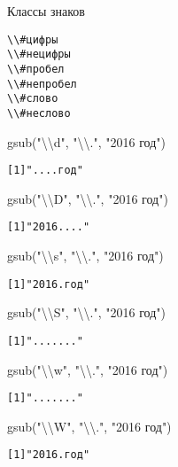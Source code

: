 \begin{frame}[fragile]{Классы знаков}
\footnotesize
\begin{alltt}
\textbackslash\textbackslash{\color{red!13!blue}{d}} \hfill \# цифры
\textbackslash\textbackslash{\color{red!13!blue}{D}} \hfill \# не цифры
\textbackslash\textbackslash{\color{red!13!blue}{s}} \hfill \# пробел
\textbackslash\textbackslash{\color{red!13!blue}{S}} \hfill \# не пробел
\textbackslash\textbackslash{\color{red!13!blue}{w}} \hfill \# слово
\textbackslash\textbackslash{\color{red!13!blue}{W}} \hfill \# не слово
\end{alltt}
\normalsize
\vfill
\begin{multicols}{2}
\begin{itemize} 
\mytem gsub("\textbackslash\textbackslash d"{}, "\textbackslash\textbackslash.{}"{}, "2016 год")
\footnotesize
\begin{alltt}
[1] ".... год"
\end{alltt}
\normalsize
\mytem gsub("\textbackslash\textbackslash D"{}, "\textbackslash\textbackslash.{}"{}, "2016 год")
\footnotesize
\begin{alltt}
[1] "2016...."
\end{alltt}
\normalsize
\mytem gsub("\textbackslash\textbackslash s"{}, "\textbackslash\textbackslash.{}"{}, "2016 год")
\footnotesize
\begin{alltt}
[1] "2016.год"
\end{alltt}
\normalsize
\columnbreak
\mytem gsub("\textbackslash\textbackslash S"{}, "\textbackslash\textbackslash.{}"{}, "2016 год")
\footnotesize
\begin{alltt}
[1] ".... ..."
\end{alltt}
\normalsize
\mytem gsub("\textbackslash\textbackslash w"{}, "\textbackslash\textbackslash.{}"{}, "2016 год")
\footnotesize
\begin{alltt}
[1] ".... ..."
\end{alltt}
\normalsize
\mytem gsub("\textbackslash\textbackslash W"{}, "\textbackslash\textbackslash.{}"{}, "2016 год")
\footnotesize
\begin{alltt}
[1] "2016.год"
\end{alltt}
\normalsize
\end{itemize}
\end{multicols}
\end{frame}
